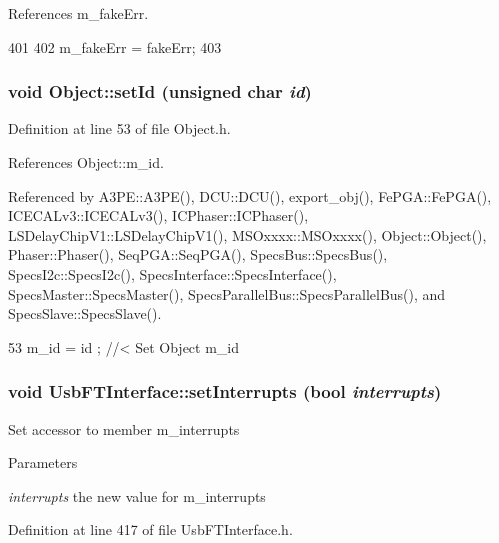 References m\_\-fakeErr.


\begin{DoxyCode}
401                                          {
402     m_fakeErr = fakeErr;
403   }
\end{DoxyCode}
\hypertarget{classObject_a398fe08cba594a0ce6891d59fe4f159f}{
\subsubsection[{setId}]{\setlength{\rightskip}{0pt plus 5cm}void Object::setId (unsigned char {\em id})}}
\label{classObject_a398fe08cba594a0ce6891d59fe4f159f}


Definition at line 53 of file Object.h.

References Object::m\_\-id.

Referenced by A3PE::A3PE(), DCU::DCU(), export\_\-obj(), FePGA::FePGA(), ICECALv3::ICECALv3(), ICPhaser::ICPhaser(), LSDelayChipV1::LSDelayChipV1(), MSOxxxx::MSOxxxx(), Object::Object(), Phaser::Phaser(), SeqPGA::SeqPGA(), SpecsBus::SpecsBus(), SpecsI2c::SpecsI2c(), SpecsInterface::SpecsInterface(), SpecsMaster::SpecsMaster(), SpecsParallelBus::SpecsParallelBus(), and SpecsSlave::SpecsSlave().


\begin{DoxyCode}
53 { m_id    = id    ; } //< Set Object m_id
\end{DoxyCode}
\hypertarget{classUsbFTInterface_a6fb31500f8a6adbd3d6f84f7932844da}{
\subsubsection[{setInterrupts}]{\setlength{\rightskip}{0pt plus 5cm}void UsbFTInterface::setInterrupts (bool {\em interrupts})}}
\label{classUsbFTInterface_a6fb31500f8a6adbd3d6f84f7932844da}
Set accessor to member m\_\-interrupts 
\begin{DoxyParams}{Parameters}
\item[{\em interrupts}]the new value for m\_\-interrupts \end{DoxyParams}


Definition at line 417 of file UsbFTInterface.h.

